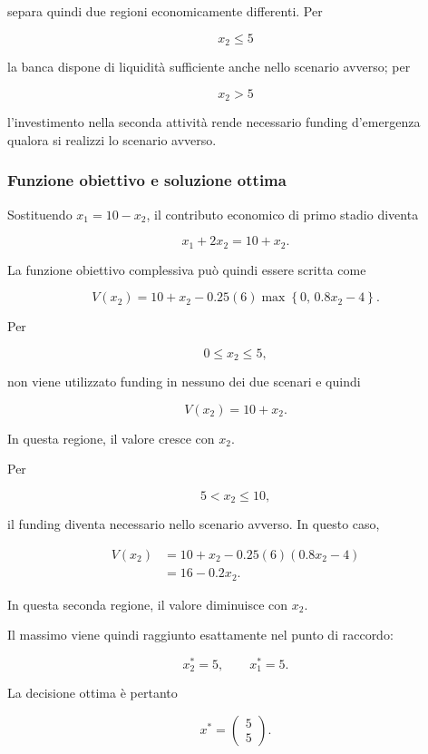 \noindent separa quindi due regioni economicamente differenti. Per

\[
x_2\leq5
\]

\noindent la banca dispone di liquidit\`a sufficiente anche nello scenario avverso;
per

\[
x_2>5
\]

\noindent l'investimento nella seconda attivit\`a rende necessario funding
d'emergenza qualora si realizzi lo scenario avverso.

\subsubsection{Funzione obiettivo e soluzione ottima}

Sostituendo $x_1=10-x_2$, il contributo economico di primo stadio diventa

\[
x_1+2x_2
=
10+x_2.
\]

La funzione obiettivo complessiva pu\`o quindi essere scritta come

\begin{equation}
V(x_2)
=
10+x_2
-
0.25(6)
\max
\left\{
0,\,
0.8x_2-4
\right\}.
\label{eq:cap14-esempio-due-scenari}
\end{equation}

Per

\[
0\leq x_2\leq5,
\]

\noindent non viene utilizzato funding in nessuno dei due scenari e quindi

\[
V(x_2)=10+x_2.
\]

In questa regione, il valore cresce con $x_2$.

Per

\[
5<x_2\leq10,
\]

\noindent il funding diventa necessario nello scenario avverso. In questo caso,

\[
\begin{split}
V(x_2)
&=
10+x_2
-
0.25(6)(0.8x_2-4)
\\
&=
16-0.2x_2.
\end{split}
\]

In questa seconda regione, il valore diminuisce con $x_2$.

Il massimo viene quindi raggiunto esattamente nel punto di raccordo:

\[
x_2^*=5,
\qquad
x_1^*=5.
\]

La decisione ottima \`e pertanto

\[
x^*
=
\begin{pmatrix}
5\\
5
\end{pmatrix}.
\]

